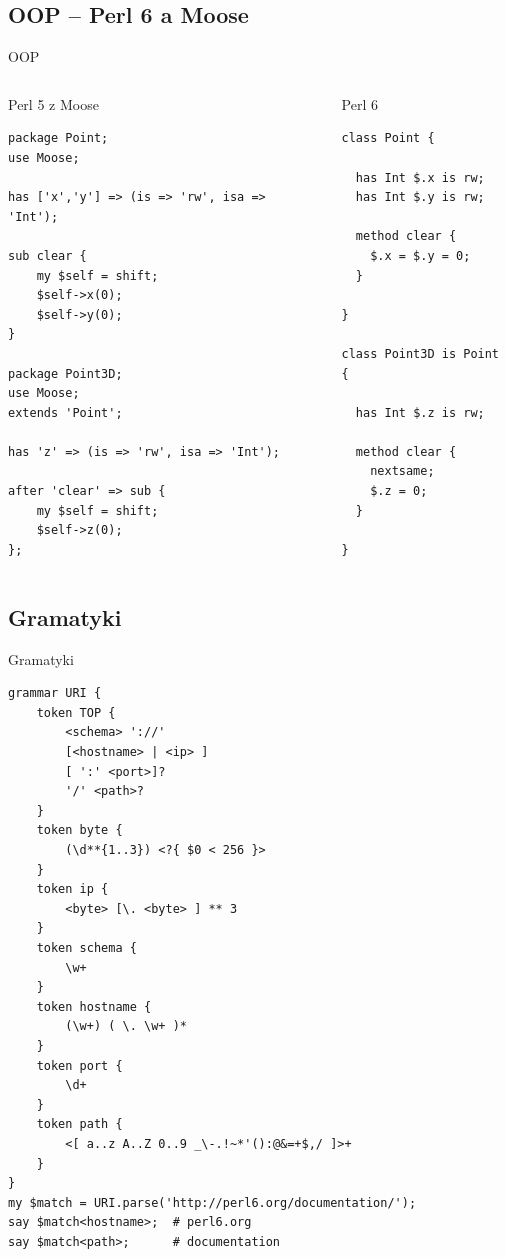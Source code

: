 \documentclass{beamer}
\begin{document}
			\subsection{OOP -- Perl 6 a Moose}
\begin{frame}[fragile]{OOP}
\begin{columns}[t]
	\begin{column}{0.5\textwidth}
	\begin{block}{Perl 5 z Moose}
{\tiny
\begin{verbatim}
package Point;
use Moose;

has ['x','y'] => (is => 'rw', isa => 'Int');

sub clear {
    my $self = shift;
    $self->x(0);
    $self->y(0);
}

package Point3D;
use Moose;
extends 'Point';

has 'z' => (is => 'rw', isa => 'Int');

after 'clear' => sub {
    my $self = shift;
    $self->z(0);
};
\end{verbatim}
}
	\end{block}
	\end{column}
	\begin{column}{0.5\textwidth}
	\begin{block}{Perl 6}
{\tiny
\begin{verbatim}
class Point {

  has Int $.x is rw;
  has Int $.y is rw;

  method clear {
    $.x = $.y = 0;
  }

}

class Point3D is Point {

  has Int $.z is rw;

  method clear {
    nextsame;
    $.z = 0;
  }

}
\end{verbatim}
}
	\end{block}
	\end{column}
\end{columns}
\end{frame}
			\subsection{Gramatyki}
\begin{frame}[fragile]{Gramatyki}
\tiny
\begin{verbatim}
grammar URI {
    token TOP {
        <schema> '://' 
        [<hostname> | <ip> ]
        [ ':' <port>]?
        '/' <path>?
    }
    token byte {
        (\d**{1..3}) <?{ $0 < 256 }>
    }
    token ip {
        <byte> [\. <byte> ] ** 3
    }
    token schema {
        \w+
    }
    token hostname {
        (\w+) ( \. \w+ )*
    }
    token port {
        \d+
    }
    token path {
        <[ a..z A..Z 0..9 _\-.!~*'():@&=+$,/ ]>+
    }
}
my $match = URI.parse('http://perl6.org/documentation/');
say $match<hostname>;  # perl6.org
say $match<path>;      # documentation
\end{verbatim}
\end{frame}
\end{document}

